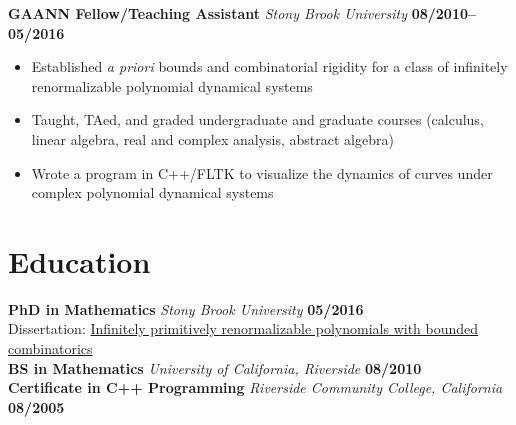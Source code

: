\documentclass[11pt]{article}
\begin{document}
\vspace{0.5cm}
\noindent\textbf{GAANN Fellow/Teaching Assistant} \emph{Stony Brook University} \hfill \textbf{08/2010--05/2016}
\begin{itemize}
  \itemsep 0em
  \item Established \textit{a priori} bounds and combinatorial rigidity for a class of infinitely renormalizable polynomial dynamical systems
  \item Taught, TAed, and graded undergraduate and graduate courses (calculus, linear algebra, real and complex analysis, abstract algebra)
  \item Wrote a program in C++/FLTK to visualize the dynamics of curves under complex polynomial dynamical systems
\end{itemize}

\section*{Education}
\noindent\textbf{PhD in Mathematics} \emph{Stony Brook University} \hfill \textbf{05/2016}\\
Dissertation: \href{http://hdl.handle.net/11401/76376}{Infinitely primitively renormalizable polynomials with bounded combinatorics}\\
\noindent\textbf{BS in Mathematics} \emph{University of California, Riverside} \hfill \textbf{08/2010}\\
\noindent\textbf{Certificate in C++ Programming} \emph{Riverside Community College, California} \hfill \textbf{08/2005}
\end{document}

